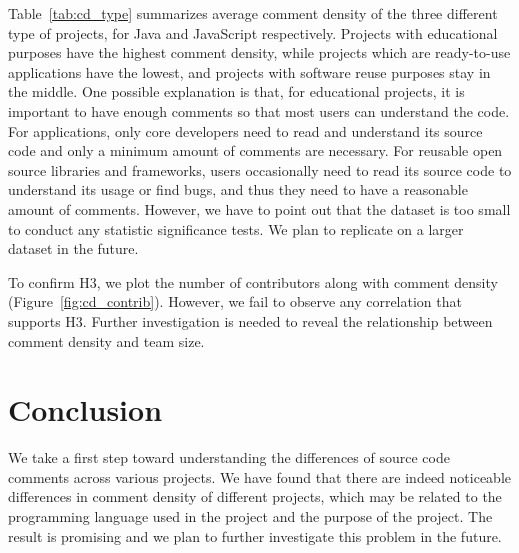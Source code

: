 \documentclass[sigconf,screen]{acmart}
\begin{document}
Table~\ref{tab:cd_type} summarizes average comment density of the three different type of projects, for Java and JavaScript respectively. Projects with educational purposes have the highest comment density, while projects which are ready-to-use applications have the lowest, and projects with software reuse purposes stay in the middle. One possible explanation is that, for educational projects, it is important to have enough comments so that most users can understand the code. For applications, only core developers need to read and understand its source code and only a minimum amount of comments are necessary. For reusable open source libraries and frameworks, users occasionally need to read its source code to understand its usage or find bugs, and thus they need to have a reasonable amount of comments. However, we have to point out that the dataset is too small to conduct any statistic significance tests. We plan to replicate on a larger dataset in the future.

To confirm H3, we plot the number of contributors along with comment density (Figure~\ref{fig:cd_contrib}). However, we fail to observe any correlation that supports H3. Further investigation is needed to reveal the relationship between comment density and team size. 

\section{Conclusion}
 
We take a first step toward understanding the differences of source code comments across various projects. 
We have found that there are indeed noticeable differences in comment density of different projects, which may be related to the programming language used in the project and the purpose of the project. The result is promising and we plan to further investigate this problem in the future. %



\end{document}
